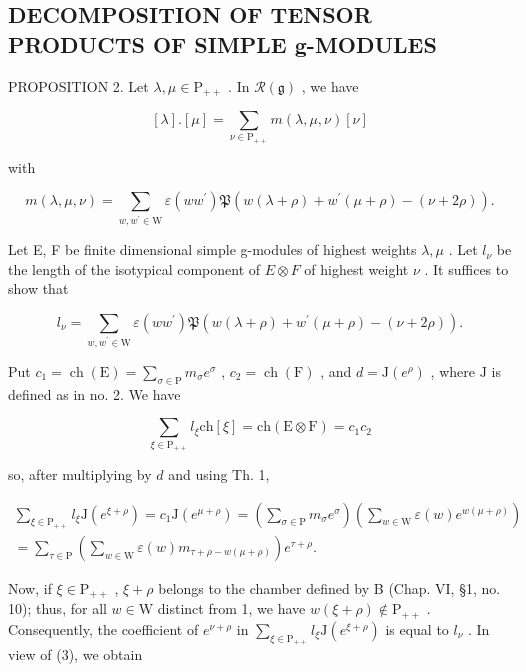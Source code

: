 \subsection{DECOMPOSITION OF TENSOR PRODUCTS OF SIMPLE g-MODULES}

PROPOSITION 2. Let \(\lambda, \mu \in \mathrm{P}_{++}\) . In \(\mathcal{R}(\mathfrak{g})\) , we have

\[
[ \lambda ]. [ \mu ] = \sum_ {\nu \in \mathrm{P} _ {+ +}} m (\lambda , \mu , \nu) [ \nu ]
\]

with

\[
m (\lambda , \mu , \nu) = \sum_ {w, w ^ {\prime} \in \mathrm{W}} \varepsilon (w w ^ {\prime}) \mathfrak {P} (w (\lambda + \rho) + w ^ {\prime} (\mu + \rho) - (\nu + 2 \rho)).
\]

Let E, F be finite dimensional simple g-modules of highest weights \(\lambda, \mu\) . Let \(l_{\nu}\) be the length of the isotypical component of \(E \otimes F\) of highest weight \(\nu\) . It suffices to show that

\[
l _ {\nu} = \sum_ {w, w ^ {\prime} \in \mathrm{W}} \varepsilon (w w ^ {\prime}) \mathfrak {P} (w (\lambda + \rho) + w ^ {\prime} (\mu + \rho) - (\nu + 2 \rho)).\tag{2}
\]

Put \(c_{1} = \operatorname{ch}(\mathrm{E}) = \sum_{\sigma \in \mathrm{P}} m_{\sigma} e^{\sigma}\) , \(c_{2} = \operatorname{ch}(\mathrm{F})\) , and \(d = \mathrm{J}(e^{\rho})\) , where \(\mathrm{J}\) is defined as in no. 2. We have

\[
\sum_ {\xi \in \mathrm{P} _ {+ +}} l _ {\xi} \mathrm{ch} [ \xi ] = \mathrm{ch} (\mathrm{E} \otimes \mathrm{F}) = c _ {1} c _ {2}
\]

so, after multiplying by \(d\) and using Th. 1,

\[
\begin{array}{c} \sum_ {\xi \in \mathrm{P} _ {+ +}} l _ {\xi} \mathrm{J} (e ^ {\xi + \rho}) = c _ {1} \mathrm{J} (e ^ {\mu + \rho}) = \left(\sum_ {\sigma \in \mathrm{P}} m _ {\sigma} e ^ {\sigma}\right) \left(\sum_ {w \in \mathrm{W}} \varepsilon (w) e ^ {w (\mu + \rho)}\right) \\ = \sum_ {\tau \in \mathrm{P}} \left(\sum_ {w \in \mathrm{W}} \varepsilon (w) m _ {\tau + \rho - w (\mu + \rho)}\right) e ^ {\tau + \rho}. \end{array}\tag{3}
\]

Now, if \(\xi \in \mathrm{P}_{++}\) , \(\xi + \rho\) belongs to the chamber defined by B (Chap. VI, §1, no. 10); thus, for all \(w \in \mathrm{W}\) distinct from 1, we have \(w(\xi + \rho) \notin \mathrm{P}_{++}\) . Consequently, the coefficient of \(e^{\nu + \rho}\) in \(\sum_{\xi \in \mathrm{P}_{++}} l_{\xi} \mathrm{J}(e^{\xi + \rho})\) is equal to \(l_{\nu}\) . In view of (3), we obtain

